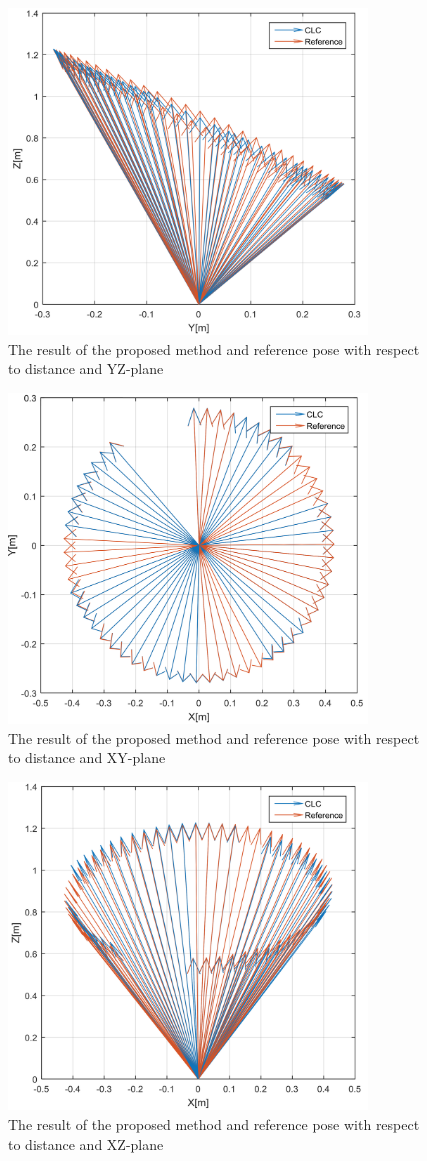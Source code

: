 \documentclass[master,korean,final]{cbnu-ecs}
\begin{document}
\begin{figure}[!ht]
  \centering
	\includegraphics[width=360px]{img/pose_yz.png}
  \caption{The result of the proposed method and reference pose with respect to distance and YZ-plane }
\label{pose_yz}
\end{figure}
\begin{figure}[!ht]
  \centering
	\includegraphics[width=360px]{img/pose_yx.png}
  \caption{The result of the proposed method and reference pose with respect to distance and XY-plane }
\label{pose_xy}
\end{figure}
\begin{figure}[!ht]
  \centering
	\includegraphics[width=360px]{img/pose_zx.png}
  \caption{The result of the proposed method and reference pose with respect to distance and XZ-plane }
\label{pose_zx}
\end{figure}
\end{document}
